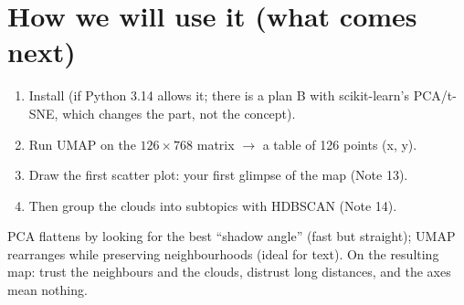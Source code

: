 \documentclass[11pt,a4paper]{article}
\begin{document}
\section{How we will use it (what comes next)}

\begin{enumerate}
  \item Install  (if Python 3.14 allows it; there is a plan B with
        scikit-learn's PCA/t-SNE, which changes the part, not the concept).
  \item Run UMAP on the $126 \times 768$ matrix $\rightarrow$ a table of 126 points (x, y).
  \item Draw the first scatter plot: your first glimpse of the map (Note 13).
  \item Then group the clouds into subtopics with HDBSCAN (Note 14).
\end{enumerate}

\begin{resumen}
PCA flattens by looking for the best ``shadow angle'' (fast but straight); UMAP rearranges
while preserving neighbourhoods (ideal for text). On the resulting map: trust the neighbours
and the clouds, distrust long distances, and the axes mean nothing.
\end{resumen}
\end{document}
